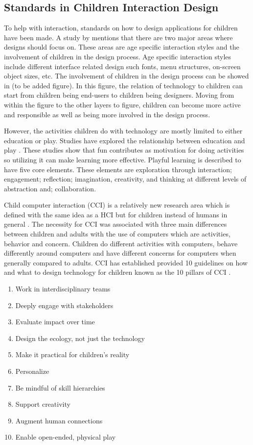 \subsection{Standards in Children Interaction Design}

To help with interaction, standards on how to design applications for children have been made. A study by \cite{markopoulos2003interaction} mentions that there are two major areas where designs should focus on. These areas are age specific interaction styles and the involvement of children in the design process. Age specific interaction styles include different interface related design such fonts, menu structures, on-screen object sizes, etc. The involvement of children in the design process can be showed in (to be added figure). In this figure, the relation of technology to children can start from children being end-users to children being designers. Moving from within the figure to the other layers to figure, children can become more active and responsible as well as being more involved in the design process.

However, the activities children do with technology are mostly limited to either education or play. Studies have explored the relationship between education and play \cite{markopoulos2003interaction}. These studies show that fun contributes as motivation for doing activities so utilizing it can make learning more effective. Playful learning is described to have five core elements. These elements are exploration through interaction; engagement; reflection; imagination, creativity, and thinking at different levels of abstraction and; collaboration.

Child computer interaction (CCI) is a relatively new research area which is defined with the same idea as a HCI but for children instead of humans in general \cite{read2011nature}. The necessity for CCI was associated with three main differences between children and adults with the use of computers which are activities, behavior and concern. Children do different activities with computers, behave differently around computers and have different concerns for computers when generally compared to adults. CCI has established provided 10 guidelines on how and what to design technology for children known as the 10 pillars of CCI \cite{hourcade2015child}.

\begin{enumerate} 
\item Work in interdisciplinary teams
\item Deeply engage with stakeholders
\item Evaluate impact over time
\item Design the ecology, not just the technology
\item Make it practical for children’s reality
\item Personalize
\item Be mindful of skill hierarchies
\item Support creativity
\item Augment human connections
\item Enable open-ended, physical play
\end{enumerate}

